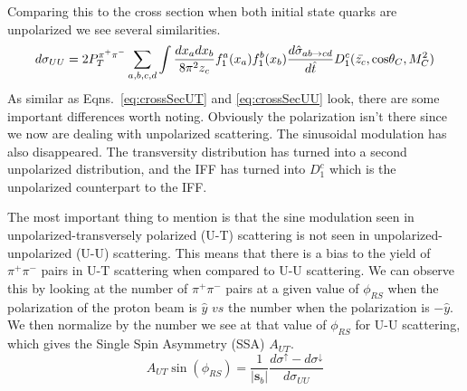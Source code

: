 \documentclass[letterpaper, abstract = on,listof=totoc, bibliography=totoc]{scrreprt}
\newcommand{\phirs}{\phi_{RS}}
\newcommand{\ptpair}{P_{T}^{\pi^+\pi^-}}
\newcommand{\pip}{\pi^+}
\newcommand{\pim}{\pi^-}
\newcommand{\pair}{$\pip\pim$ }
\begin{document}

Comparing this to the cross section when both initial state quarks are unpolarized we see several similarities.
\begin{equation}
\label{eq:crossSecUU}
d\sigma_{UU} = 2 \ptpair \sum_{a,b,c,d} \int \frac{dx_adx_b}{8\pi^2z_c} f_1^a(x_a)f_1^b(x_b) \frac{d\hat{\sigma}_{ab \rightarrow cd}}{d\hat{t}}D_1^c(\bar{z_c},\textnormal{cos}\theta_C,M_C^2)
\end{equation}
As similar as Eqns.~\ref{eq:crossSecUT} and \ref{eq:crossSecUU} look, there are some important differences worth noting. Obviously the polarization isn't there since we now are dealing with unpolarized scattering. The sinusoidal modulation has also disappeared. The transversity distribution has turned into a second unpolarized distribution, and the IFF has turned into $D_1^c$ which is the unpolarized counterpart to the IFF.   

The most important thing to mention is that the sine modulation seen in unpolarized-transversely polarized (U-T) scattering is not seen in unpolarized-unpolarized (U-U) scattering. This means that there is a bias to the yield of \pair pairs in U-T scattering when compared to U-U scattering. We can observe this by looking at the number of \pair pairs at a given value of $\phirs$ when the polarization of the proton beam is $\hat{y}$ $vs$ the number when the polarization is $-\hat{y}$. We then normalize by the number we see at that value of $\phirs$ for U-U scattering, which gives the Single Spin Asymmetry (SSA) $A_{UT}$.
\begin{equation}
\label{eq:asymCS}
A_{UT} \sin (\phirs) =\frac{1}{|\bm{s}_b|} \frac{d\sigma^\uparrow - d\sigma^\downarrow}{d\sigma_{UU}}
\end{equation}
\end{document}
